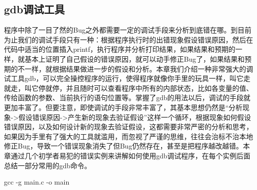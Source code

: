 \documentclass[11pt]{article}
\begin{document}
\subsection{gdb调试工具}
\label{sec-1-7}
程序中除了一目了然的Bug之外都需要一定的调试手段来分析到底错在哪。到目前为止我们的调试手段只有一种：根据程序执行时的出错现象假设错误原因，然后在代码中适当的位置插入printf，执行程序并分析打印结果，如果结果和预期的一样，就基本上证明了自己假设的错误原因，就可以动手修正Bug了，如果结果和预期的不一样，就根据结果做进一步的假设和分析。本章我们介绍一种非常强大的调试工具gdb，可以完全操控程序的运行，使得程序就像你手里的玩具一样，叫它走就走，叫它停就停，并且随时可以查看程序中所有的内部状态，比如各变量的值、传给函数的参数、当前执行的语句位置等。掌握了gdb的用法以后，调试的手段就更加丰富了。但要注意，即使调试的手段非常丰富了，其基本思想仍然是“分析现象->假设错误原因->产生新的现象去验证假设”这样一个循环，根据现象如何假设错误原因，以及如何设计新的现象去验证假设，这都需要非常严密的分析和思考，如果因为手里有了强大的工具就滥用，而忽视了严谨的思维，往往会治标不治本地修正Bug，导致一个错误现象消失了但Bug仍然存在，甚至是把程序越改越错。本章通过几个初学者易犯的错误实例来讲解如何使用gdb调试程序，在每个实例后面总结一部分常用的gdb命令。

gcc -g main.c -o main
\end{document}
